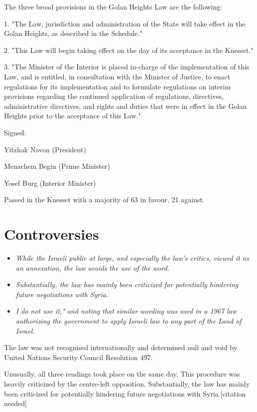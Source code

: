 The three broad provisions in the Golan Heights Law are the following:

1. "The Law, jurisdiction and administration of the State will take
effect in the Golan Heights, as described in the Schedule."

2. "This Law will begin taking effect on the day of its acceptance in
the Knesset."

3. "The Minister of the Interior is placed in-charge of the
implementation of this Law, and is entitled, in consultation with the
Minister of Justice, to enact regulations for its implementation and to
formulate regulations on interim provisions regarding the continued
application of regulations, directives, administrative directives, and
rights and duties that were in effect in the Golan Heights prior to the
acceptance of this Law."

Signed:

Yitzhak Navon (President)

Menachem Begin (Prime Minister)

Yosef Burg (Interior Minister)

Passed in the Knesset with a majority of 63 in favour, 21 against.

\section{Controversies}\label{controversies}

\begin{itemize}
\item
  \emph{While the Israeli public at large, and especially the law's
  critics, viewed it as an annexation, the law avoids the use of the
  word.}
\item
  \emph{Substantially, the law has mainly been criticized for
  potentially hindering future negotiations with Syria.}
\item
  \emph{I do not use it," and noting that similar wording was used in a
  1967 law authorizing the government to apply Israeli law to any part
  of the Land of Israel.}
\end{itemize}

The law was not recognised internationally and determined null and void
by United Nations Security Council Resolution 497.

Unusually, all three readings took place on the same day. This procedure
was heavily criticized by the centre-left opposition. Substantially, the
law has mainly been criticized for potentially hindering future
negotiations with Syria.{[}citation needed{]}

